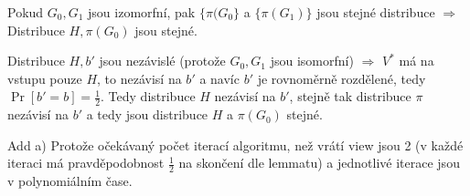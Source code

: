 \documentclass[a4paper,12pt,titlepage]{article}
\begin{document}
Pokud $G_0, G_1$ jsou izomorfní, pak $\{\pi(G_0\}$ a $\{\pi(G_1)\}$ jsou stejné distribuce $\Rightarrow$ Distribuce $H,\pi(G_0)$ jsou stejné.

	Distribuce $H,b'$ jsou nezávislé (protože $G_0,G_1$ jsou isomorfní) $\Rightarrow$ $V^*$ má na vstupu pouze $H$, to nezávisí na $b'$ a navíc $b'$ je rovnoměrně rozdělené, tedy $\Pr[b'=b]=\frac{1}{2}$. Tedy distribuce $H$ nezávisí na $b'$, stejně tak distribuce $\pi$ nezávisí na $b'$ a tedy jsou distribuce $H$ a $\pi(G_0)$ stejné.

Add a)
Protože očekávaný počet iterací algoritmu, než vrátí view jsou 2 (v každé iteraci má pravděpodobnost $\frac{1}{2}$ na skončení dle lemmatu) a jednotlivé iterace jsou v polynomiálním čase.
\end{document}
